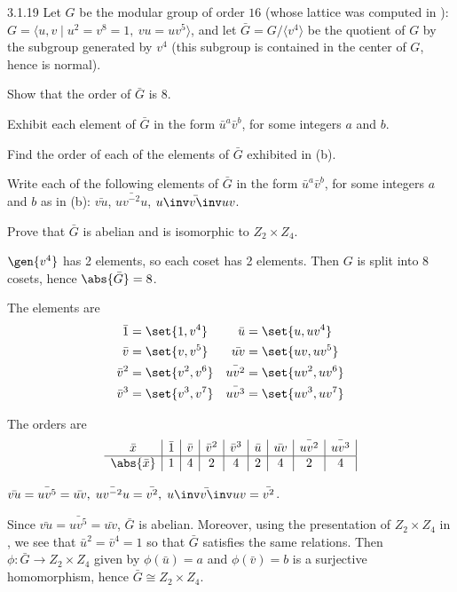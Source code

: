 \begin{exercise}{3.1.19}
    Let $G$ be the modular group of order $16$ (whose lattice was computed in ): $G = \langle u,v \mid u^2 = v^8 = 1,\ vu = uv^5 \rangle$, and let $\bar{G} = G/\langle v^4 \rangle$ be the quotient of $G$ by the subgroup generated by $v^4$ (this subgroup is contained in the center of $G$, hence is normal).
    \begin{subexercises}
        \item Show that the order of $\bar{G}$ is $8$.
        \item Exhibit each element of $\bar{G}$ in the form $\bar{u}^a \bar{v}^b$, for some integers $a$ and $b$.
        \item Find the order of each of the elements of $\bar{G}$ exhibited in (b).
        \item Write each of the following elements of $\bar{G}$ in the form $\bar{u}^a \bar{v}^b$, for some integers $a$ and $b$ as in (b): $\bar{vu}$, $\bar{uv^{-2}u}$, $\bar{u\inv v\inv uv}$.
        \item Prove that $\bar{G}$ is abelian and is isomorphic to $Z_2 \times Z_4$.
    \end{subexercises}
\end{exercise}

\begin{solenum}
    \item $\gen{v^4}$ has 2 elements, so each coset has 2 elements.
	Then $G$ is split into 8 cosets, hence $\abs{\bar G} = 8$.
    \item The elements are
    \begin{align*}
        \bar 1 & = \set{1, v^4} & \bar u & = \set{u, uv^4} \\
        \bar v & = \set{v, v^5} & \bar{uv} & = \set{uv, uv^5} \\
        \bar v^2 & = \set{v^2, v^6} & \bar{uv^2} & = \set{uv^2, uv^6} \\
        \bar v^3 & = \set{v^3, v^7} & \bar{uv^3} & = \set{uv^3, uv^7}
    \end{align*}
    \item The orders are
    \[
        \begin{array}{*{9}{c|}}
            \bar x & \bar 1 & \bar v & \bar v^2 & \bar v^3 & \bar u & \bar{uv} & \bar{uv^2} & \bar{uv^3} \\
            \hline
            \abs{\bar x} & 1 & 4 & 2 & 4 & 2 & 4 & 2 & 4
        \end{array}
    \]
    \item $\bar{vu} = \bar{uv^5} = \bar{uv},\; \bar{uv^{-2}u} = \bar{v^2},\; \bar{u\inv v\inv uv} = \bar{v^2}$.
    \item Since $\bar{vu} = \bar{uv^5} = \bar{uv}$, $\bar G$ is abelian.
	Moreover, using the presentation of $Z_2 \times Z_4$ in , we see that $\bar u^2 = \bar v^4 = 1$ so that $\bar G$ satisfies the same relations.
	Then $\phi \colon \bar G \to Z_2 \times Z_4$ given by $\phi(\bar u) = a$ and $\phi(\bar v) = b$ is a surjective homomorphism, hence $\bar G \cong Z_2 \times Z_4$.
\end{solenum}

